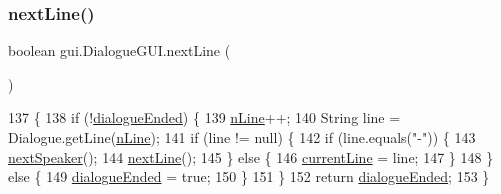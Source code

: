 \mbox{\label{classgui_1_1_dialogue_g_u_i_a44bb149e1e51c69ba5c65b34cc1dfc3f}} 
\subsubsection{\texorpdfstring{next\+Line()}{nextLine()}}
{\footnotesize\ttfamily boolean gui.\+Dialogue\+G\+U\+I.\+next\+Line (\begin{DoxyParamCaption}{ }\end{DoxyParamCaption})\hspace{0.3cm}{\ttfamily [inline]}}


\begin{DoxyCode}
137                               \{
138         \textcolor{keywordflow}{if} (!\mbox{\hyperlink{classgui_1_1_dialogue_g_u_i_a0ce37741e9f2b0ad3a749977fe9a1477}{dialogueEnded}}) \{
139             \mbox{\hyperlink{classgui_1_1_dialogue_g_u_i_a1270df90f92a6329173e530568d8a81d}{nLine}}++;
140             String line = Dialogue.getLine(\mbox{\hyperlink{classgui_1_1_dialogue_g_u_i_a1270df90f92a6329173e530568d8a81d}{nLine}});
141             \textcolor{keywordflow}{if} (line != null) \{
142                 \textcolor{keywordflow}{if} (line.equals(\textcolor{stringliteral}{"-"})) \{
143                     \mbox{\hyperlink{classgui_1_1_dialogue_g_u_i_a67f1da29cd81e9836345c7b88a82ffb4}{nextSpeaker}}();
144                     \mbox{\hyperlink{classgui_1_1_dialogue_g_u_i_a44bb149e1e51c69ba5c65b34cc1dfc3f}{nextLine}}();
145                 \} \textcolor{keywordflow}{else} \{
146                     \mbox{\hyperlink{classgui_1_1_dialogue_g_u_i_a44a2c9abf9ce5527b307a1828266d199}{currentLine}} = line;
147                 \}
148             \} \textcolor{keywordflow}{else} \{
149                 \mbox{\hyperlink{classgui_1_1_dialogue_g_u_i_a0ce37741e9f2b0ad3a749977fe9a1477}{dialogueEnded}} = \textcolor{keyword}{true};
150             \}
151         \}
152         \textcolor{keywordflow}{return} \mbox{\hyperlink{classgui_1_1_dialogue_g_u_i_a0ce37741e9f2b0ad3a749977fe9a1477}{dialogueEnded}};
153     \}
\end{DoxyCode}
\mbox{\label{classgui_1_1_dialogue_g_u_i_a67f1da29cd81e9836345c7b88a82ffb4}} 
